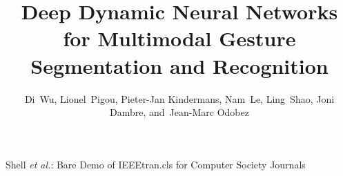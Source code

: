 \documentclass[10pt,journal,compsoc]{IEEEtran}
\begin{document}
\title{Deep Dynamic Neural Networks for Multimodal Gesture
Segmentation and Recognition}

\author{Di~Wu,
        Lionel~Pigou,
        Pieter-Jan Kindermans,
        Nam~Le,
        Ling~Shao,
        Joni Dambre,
        and~Jean-Marc Odobez
}


%
{Shell \MakeLowercase{\textit{et al.}}: Bare Demo of IEEEtran.cls for Computer Society Journals}



\maketitle
\IEEEdisplaynontitleabstractindextext
\IEEEpeerreviewmaketitle










\end{document}
